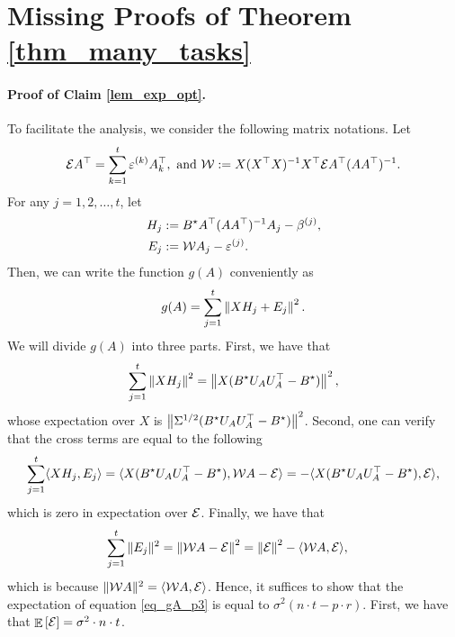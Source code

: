 	\section{Missing Proofs of Theorem \ref{thm_many_tasks}}\label{app_proof_error_same_cov}

	\paragraph{Proof of Claim \eqref{lem_exp_opt}.}
	To facilitate the analysis, we consider the following matrix notations.
	Let
		\[ \mathcal{E} A^{\top} = {\sum_{k=1}^t \varepsilon^{(k)} A_k^{\top}}, \text{ and } {\mathcal W} := X(X^{\top} X)^{-1} X^{\top} \mathcal{E} A^{\top} (AA^{\top})^{-1}. \]
	For any $j = 1,2,\dots, t$, let
	\begin{align*}
		H_j &:= B^{\star} A^{\top} (AA^{\top})^{-1} A_j - \beta^{(j)}, \\
		E_j &:= {\mathcal W} A_j - \varepsilon^{(j)}.
	\end{align*}
	Then, we can write the function $g(A)$ conveniently as
	\[ g(A) = \sum_{j=1}^t \left\| X H_j + E_j \right\|^2. \]
	We will divide $g(A)$ into three parts.
	First, we have that
	\begin{align}\label{eq_gA_p1}
		\sum_{j=1}^t \left\| X H_j \right\|^2 = \left\| X (B^{\star} U_A U_A^{\top} - B^{\star}) \right\|^2,
	\end{align}
	whose expectation over $X$ is $\left\| \Sigma^{1/2}(B^{\star} U_A U_A^{\top} - B^{\star}) \right\|^2$.
	Second, one can verify that the cross terms are equal to the following
	\begin{align}\label{eq_gA_p2}
		\sum_{j=1}^t\langle XH_j, E_j \rangle = \langle X(B^{\star} U_A U_A^{\top} - B^{\star}), {\mathcal W} A - \mathcal{E} \rangle
		= - \langle X (B^{\star} U_A U_A^{\top} - B^{\star}), \mathcal{E} \rangle,
	\end{align}
	which is zero in expectation over $\mathcal{E}$.
	Finally, we have that
	\begin{align}\label{eq_gA_p3}
		\sum_{j=1}^t \|E_j\|^2 &= \left\| {\mathcal W} A - \mathcal{E} \right\|^2
		= \left\| \mathcal{E} \right\|^2 - \langle {\mathcal W} A, \mathcal{E} \rangle,
	\end{align}
	which is because $\|{\mathcal W} A\|^2 = \langle {\mathcal W} A, \mathcal{E} \rangle$.
	Hence, it suffices to show that the expectation of equation \eqref{eq_gA_p3} is equal to $\sigma^2 (n\cdot t - p\cdot r)$.
	First, we have that $\mathop{\mathbb{E}}\left[ \mathcal{E} \right] = \sigma^2 \cdot n \cdot t$.
